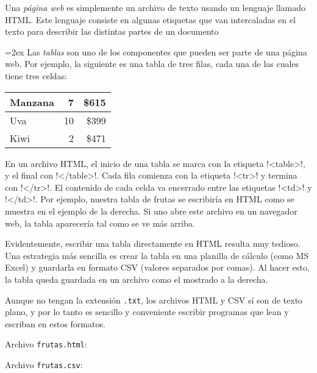 Una \emph{página web}
es simplemente un archivo de texto
usando un lenguaje llamado HTML.
Este lenguaje consiste en algunas etiquetas
que van intercaladas en el texto
para describir las distintas partes de un documento

\begin{minipage}[t]{0.7\textwidth}
  \parskip=2ex
  Las \emph{tablas} son uno de los componentes
  que pueden ser parte de una página web.
  Por ejemplo,
  la siguiente es una tabla de tres filas,
  cada una de las cuales tiene tres celdas:

  \hfil
  \begin{tabular}{|l|r|r|}  \hline
    Manzana &  7 & \$615 \\ \hline
    Uva     & 10 & \$399 \\ \hline
    Kiwi    &  2 & \$471 \\ \hline
  \end{tabular}
  \hfill

  \newcommand\lh{\li[language=html]}
  En un archivo HTML,
  el inicio de una tabla se marca con la etiqueta \lh!<table>!,
  y el final con \lh!</table>!.
  Cada fila comienza con la etiqueta \lh!<tr>!
  y termina con \lh!</tr>!.
  El contenido de cada celda va encerrado entre las etiquetas
  \lh!<td>! y \lh!</td>!.
  Por ejemplo,
  nuestra tabla de frutas se escribiría en HTML
  como se muestra en el ejemplo de la derecha.
  Si uno abre este archivo en un navegador web,
  la tabla aparecería tal como se ve más arriba.

  Evidentemente,
  escribir una tabla directamente en HTML resulta muy tedioso.
  Una estrategia más sencilla es crear la tabla en una planilla de cálculo
  (como MS Excel)
  y guardarla en formato CSV (valores separados por comas).
  Al hacer esto,
  la tabla queda guardada en un archivo como el mostrado a la derecha.

  Aunque no tengan la extensión \verb!.txt!,
  los archivos HTML y CSV sí son de texto plano,
  y por lo tanto es sencillo y conveniente escribir programas
  que lean y escriban en estos formatos.
\end{minipage}
\hfill
\begin{minipage}[t]{0.25\textwidth}
  Archivo \verb+frutas.html+:
  

  Archivo \verb+frutas.csv+:
  
\end{minipage}

